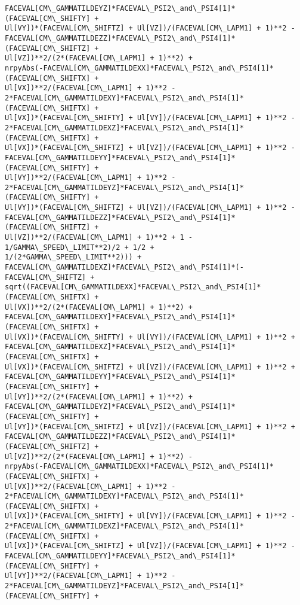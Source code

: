 \documentclass[landscape,letterpaper,10pt,english]{article}
\begin{document}
\begin{Verbatim}[commandchars=\\\{\}]
FACEVAL[CM\_GAMMATILDEYZ]*FACEVAL\_PSI2\_and\_PSI4[1]*(FACEVAL[CM\_SHIFTY] +
Ul[VY])*(FACEVAL[CM\_SHIFTZ] + Ul[VZ])/(FACEVAL[CM\_LAPM1] + 1)**2 -
FACEVAL[CM\_GAMMATILDEZZ]*FACEVAL\_PSI2\_and\_PSI4[1]*(FACEVAL[CM\_SHIFTZ] +
Ul[VZ])**2/(2*(FACEVAL[CM\_LAPM1] + 1)**2) +
nrpyAbs(-FACEVAL[CM\_GAMMATILDEXX]*FACEVAL\_PSI2\_and\_PSI4[1]*(FACEVAL[CM\_SHIFTX] +
Ul[VX])**2/(FACEVAL[CM\_LAPM1] + 1)**2 -
2*FACEVAL[CM\_GAMMATILDEXY]*FACEVAL\_PSI2\_and\_PSI4[1]*(FACEVAL[CM\_SHIFTX] +
Ul[VX])*(FACEVAL[CM\_SHIFTY] + Ul[VY])/(FACEVAL[CM\_LAPM1] + 1)**2 -
2*FACEVAL[CM\_GAMMATILDEXZ]*FACEVAL\_PSI2\_and\_PSI4[1]*(FACEVAL[CM\_SHIFTX] +
Ul[VX])*(FACEVAL[CM\_SHIFTZ] + Ul[VZ])/(FACEVAL[CM\_LAPM1] + 1)**2 -
FACEVAL[CM\_GAMMATILDEYY]*FACEVAL\_PSI2\_and\_PSI4[1]*(FACEVAL[CM\_SHIFTY] +
Ul[VY])**2/(FACEVAL[CM\_LAPM1] + 1)**2 -
2*FACEVAL[CM\_GAMMATILDEYZ]*FACEVAL\_PSI2\_and\_PSI4[1]*(FACEVAL[CM\_SHIFTY] +
Ul[VY])*(FACEVAL[CM\_SHIFTZ] + Ul[VZ])/(FACEVAL[CM\_LAPM1] + 1)**2 -
FACEVAL[CM\_GAMMATILDEZZ]*FACEVAL\_PSI2\_and\_PSI4[1]*(FACEVAL[CM\_SHIFTZ] +
Ul[VZ])**2/(FACEVAL[CM\_LAPM1] + 1)**2 + 1 - 1/GAMMA\_SPEED\_LIMIT**2)/2 + 1/2 +
1/(2*GAMMA\_SPEED\_LIMIT**2))) +
FACEVAL[CM\_GAMMATILDEXZ]*FACEVAL\_PSI2\_and\_PSI4[1]*(-FACEVAL[CM\_SHIFTZ] +
sqrt((FACEVAL[CM\_GAMMATILDEXX]*FACEVAL\_PSI2\_and\_PSI4[1]*(FACEVAL[CM\_SHIFTX] +
Ul[VX])**2/(2*(FACEVAL[CM\_LAPM1] + 1)**2) +
FACEVAL[CM\_GAMMATILDEXY]*FACEVAL\_PSI2\_and\_PSI4[1]*(FACEVAL[CM\_SHIFTX] +
Ul[VX])*(FACEVAL[CM\_SHIFTY] + Ul[VY])/(FACEVAL[CM\_LAPM1] + 1)**2 +
FACEVAL[CM\_GAMMATILDEXZ]*FACEVAL\_PSI2\_and\_PSI4[1]*(FACEVAL[CM\_SHIFTX] +
Ul[VX])*(FACEVAL[CM\_SHIFTZ] + Ul[VZ])/(FACEVAL[CM\_LAPM1] + 1)**2 +
FACEVAL[CM\_GAMMATILDEYY]*FACEVAL\_PSI2\_and\_PSI4[1]*(FACEVAL[CM\_SHIFTY] +
Ul[VY])**2/(2*(FACEVAL[CM\_LAPM1] + 1)**2) +
FACEVAL[CM\_GAMMATILDEYZ]*FACEVAL\_PSI2\_and\_PSI4[1]*(FACEVAL[CM\_SHIFTY] +
Ul[VY])*(FACEVAL[CM\_SHIFTZ] + Ul[VZ])/(FACEVAL[CM\_LAPM1] + 1)**2 +
FACEVAL[CM\_GAMMATILDEZZ]*FACEVAL\_PSI2\_and\_PSI4[1]*(FACEVAL[CM\_SHIFTZ] +
Ul[VZ])**2/(2*(FACEVAL[CM\_LAPM1] + 1)**2) -
nrpyAbs(-FACEVAL[CM\_GAMMATILDEXX]*FACEVAL\_PSI2\_and\_PSI4[1]*(FACEVAL[CM\_SHIFTX] +
Ul[VX])**2/(FACEVAL[CM\_LAPM1] + 1)**2 -
2*FACEVAL[CM\_GAMMATILDEXY]*FACEVAL\_PSI2\_and\_PSI4[1]*(FACEVAL[CM\_SHIFTX] +
Ul[VX])*(FACEVAL[CM\_SHIFTY] + Ul[VY])/(FACEVAL[CM\_LAPM1] + 1)**2 -
2*FACEVAL[CM\_GAMMATILDEXZ]*FACEVAL\_PSI2\_and\_PSI4[1]*(FACEVAL[CM\_SHIFTX] +
Ul[VX])*(FACEVAL[CM\_SHIFTZ] + Ul[VZ])/(FACEVAL[CM\_LAPM1] + 1)**2 -
FACEVAL[CM\_GAMMATILDEYY]*FACEVAL\_PSI2\_and\_PSI4[1]*(FACEVAL[CM\_SHIFTY] +
Ul[VY])**2/(FACEVAL[CM\_LAPM1] + 1)**2 -
2*FACEVAL[CM\_GAMMATILDEYZ]*FACEVAL\_PSI2\_and\_PSI4[1]*(FACEVAL[CM\_SHIFTY] +

\end{Verbatim}
\end{document}
